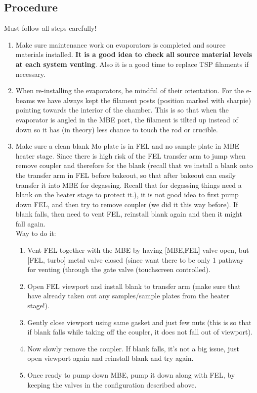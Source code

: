 \subsection{Procedure}
Must follow all steps carefully!
\begin{enumerate}
\item Make sure maintenance work on evaporators is completed and source materials installed. \textbf{It is a good idea to check all source material levels at each system venting}. Also it is a good time to replace TSP filaments if necessary.
\item When re-installing the evaporators, be mindful of their orientation. For the e-beams we have always kept the filament posts (position marked with sharpie) pointing towards the interior of the chamber. This is so that when the evaporator is angled in the MBE port, the filament is tilted up instead of down so it has (in theory) less chance to touch the rod or crucible.
\item Make sure a clean blank Mo plate is in FEL and no sample plate in MBE heater stage. Since there is high risk of the FEL transfer arm to jump when remove coupler and therefore for the blank (recall that we install a blank onto the transfer arm in FEL before bakeout, so that after bakeout can easily transfer it into MBE for degassing. Recall that for degassing things need a blank on the heater stage to protect it.), it is not good idea to first pump down FEL, and then try to remove coupler (we did it this way before). If blank falls, then need to vent FEL, reinstall blank again and then it might fall again.\\
Way to do it:
\begin{enumerate}
	\item	Vent FEL together with the MBE by having [MBE,FEL] valve open, but [FEL, turbo] metal valve closed (since want there to be only 1 pathway for venting (through the gate valve (touchscreen controlled).  
	\item	Open FEL viewport and install blank to transfer arm (make sure that have already taken out any samples/sample plates from the heater stage!). 
	\item	Gently close viewport using same gasket and just few nuts (this is so that if blank falls while taking off the coupler, it does not fall out of viewport). 
	\item	Now slowly remove the coupler. If blank falls, it’s not a big issue, just open viewport again and reinstall blank and try again.
	\item	Once ready to pump down MBE, pump it down along with FEL, by keeping the valves in the configuration described above.

\end{enumerate}
\end{enumerate}

